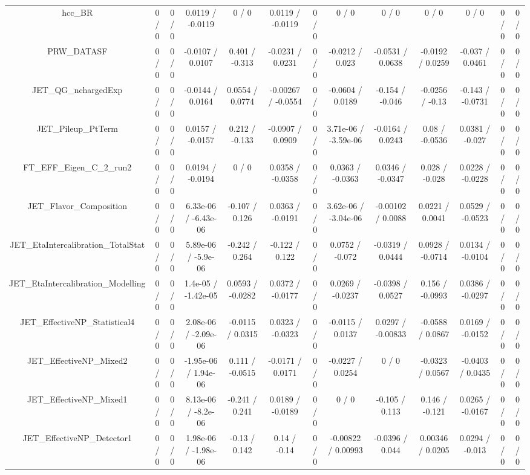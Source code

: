 \documentclass[10pt]{article}
\begin{document}
\begin{table}[htbp]
\begin{center}
\begin{tabular}{|c|c|c|c|c|c|c|c|c|c|c|c|c|}
  hcc_BR & 0 / 0 & 0 / 0 & 0.0119 / -0.0119 & 0 / 0 & 0.0119 / -0.0119 & 0 / 0 & 0 / 0 & 0 / 0 & 0 / 0 & 0 / 0 & 0 / 0 & 0 / 0 \\ 
  PRW_DATASF & 0 / 0 & 0 / 0 & -0.0107 / 0.0107 & 0.401 / -0.313 & -0.0231 / 0.0231 & 0 / 0 & -0.0212 / 0.023 & -0.0531 / 0.0638 & -0.0192 / 0.0259 & -0.037 / 0.0461 & 0 / 0 & 0 / 0 \\ 
  JET_QG_nchargedExp & 0 / 0 & 0 / 0 & -0.0144 / 0.0164 & 0.0554 / 0.0774 & -0.00267 / -0.0554 & 0 / 0 & -0.0604 / 0.0189 & -0.154 / -0.046 & -0.0256 / -0.13 & -0.143 / -0.0731 & 0 / 0 & 0 / 0 \\ 
  JET_Pileup_PtTerm & 0 / 0 & 0 / 0 & 0.0157 / -0.0157 & 0.212 / -0.133 & -0.0907 / 0.0909 & 0 / 0 & 3.71e-06 / -3.59e-06 & -0.0164 / 0.0243 & 0.08 / -0.0536 & 0.0381 / -0.027 & 0 / 0 & 0 / 0 \\ 
  FT_EFF_Eigen_C_2_run2 & 0 / 0 & 0 / 0 & 0.0194 / -0.0194 & 0 / 0 & 0.0358 / -0.0358 & 0 / 0 & 0.0363 / -0.0363 & 0.0346 / -0.0347 & 0.028 / -0.028 & 0.0228 / -0.0228 & 0 / 0 & 0 / 0 \\ 
  JET_Flavor_Composition & 0 / 0 & 0 / 0 & 6.33e-06 / -6.43e-06 & -0.107 / 0.126 & 0.0363 / -0.0191 & 0 / 0 & 3.62e-06 / -3.04e-06 & -0.00102 / 0.0088 & 0.0221 / 0.0041 & 0.0529 / -0.0523 & 0 / 0 & 0 / 0 \\ 
  JET_EtaIntercalibration_TotalStat & 0 / 0 & 0 / 0 & 5.89e-06 / -5.9e-06 & -0.242 / 0.264 & -0.122 / 0.122 & 0 / 0 & 0.0752 / -0.072 & -0.0319 / 0.0444 & 0.0928 / -0.0714 & 0.0134 / -0.0104 & 0 / 0 & 0 / 0 \\ 
  JET_EtaIntercalibration_Modelling & 0 / 0 & 0 / 0 & 1.4e-05 / -1.42e-05 & 0.0593 / -0.0282 & 0.0372 / -0.0177 & 0 / 0 & 0.0269 / -0.0237 & -0.0398 / 0.0527 & 0.156 / -0.0993 & 0.0386 / -0.0297 & 0 / 0 & 0 / 0 \\ 
  JET_EffectiveNP_Statistical4 & 0 / 0 & 0 / 0 & 2.08e-06 / -2.09e-06 & -0.0115 / 0.0315 & 0.0323 / -0.0323 & 0 / 0 & -0.0115 / 0.0137 & 0.0297 / -0.00833 & -0.0588 / 0.0867 & 0.0169 / -0.0152 & 0 / 0 & 0 / 0 \\ 
  JET_EffectiveNP_Mixed2 & 0 / 0 & 0 / 0 & -1.95e-06 / 1.94e-06 & 0.111 / -0.0515 & -0.0171 / 0.0171 & 0 / 0 & -0.0227 / 0.0254 & 0 / 0 & -0.0323 / 0.0567 & -0.0403 / 0.0435 & 0 / 0 & 0 / 0 \\ 
  JET_EffectiveNP_Mixed1 & 0 / 0 & 0 / 0 & 8.13e-06 / -8.2e-06 & -0.241 / 0.241 & 0.0189 / -0.0189 & 0 / 0 & 0 / 0 & -0.105 / 0.113 & 0.146 / -0.121 & 0.0265 / -0.0167 & 0 / 0 & 0 / 0 \\ 
  JET_EffectiveNP_Detector1 & 0 / 0 & 0 / 0 & 1.98e-06 / -1.98e-06 & -0.13 / 0.142 & 0.14 / -0.14 & 0 / 0 & -0.00822 / 0.00993 & -0.0396 / 0.044 & 0.00346 / 0.0205 & 0.0294 / -0.013 & 0 / 0 & 0 / 0 \\ 

\end{tabular}
\end{center}
\end{table}
\end{document}
